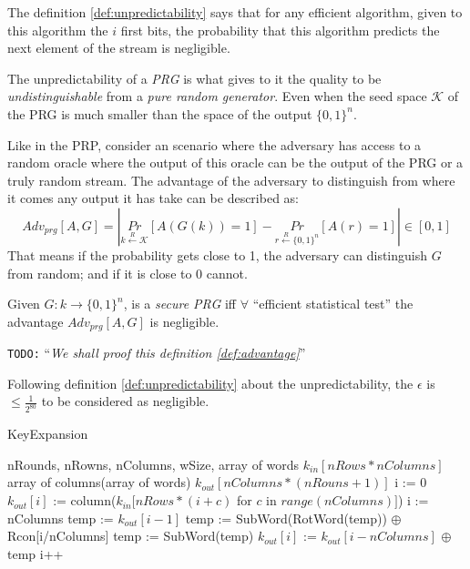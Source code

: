 \documentclass[10pt,a4paper,twoside]{llncs}
\newcommand{\todo}[1]{\texttt{\color{red}TODO:} ``\emph{#1}''}
\begin{document}
The definition \ref{def:unpredictability} says that for any efficient algorithm, given to this algorithm the $i$ first bits, the probability that this algorithm predicts the next element of the stream is negligible.

The unpredictability of a \emph{PRG} is what gives to it the quality to be \emph{undistinguishable} from a \emph{pure random generator}. Even when the seed space $\mathcal{K}$ of the PRG is much smaller than the space of the output $\{0,1\}^n$.

Like in the PRP, consider an scenario where the adversary has access to a random oracle where the output of this oracle can be the output of the PRG or a truly random stream. The advantage of the adversary to distinguish from where it comes any output it has take can be described as:
\begin{equation}\label{eq:prgAdv}
 {Adv}_{prg}[A,G] = \left|
                     \underset{k\overset{R}{\leftarrow}\mathcal{K}}{Pr}\left[A(G(k))=1\right]-
                     \underset{r\overset{R}{\leftarrow}\{0,1\}^n}{Pr}\left[A(r)=1\right]
                    \right|\in [0,1]
\end{equation}
That means if the probability gets close to 1, the adversary can distinguish $G$ from random; and if it is close to 0 cannot.

\begin{definition}\label{def:advantage}
 Given $G: k \rightarrow \{0,1\}^n$, is a \emph{secure PRG} iff $\forall$ ``efficient statistical test'' the advantage ${Adv}_{prg}[A,G]$ is negligible.
\end{definition}

\todo{We shall proof this definition \ref{def:advantage}}

Following definition \ref{def:unpredictability} about the unpredictability, the $\epsilon$ is $\leqslant\frac{1}{2^{80}}$ to be considered as negligible.

\begin{algorithm}
 \caption{KeyExpansion}
 \label{alg:keyExpansion}
 \begin{algorithmic}[1]
  \REQUIRE nRounds, nRowns, nColumns, wSize, array of words $k_{in}[nRows*nColumns]$
  \ENSURE array of columns(array of words) $k_{out}[nColumns*(nRouns+1)]$
  \STATE i := 0
    \STATE $k_{out}[i]$ := column($k_{in}[nRows*(i+c)$ for $c$ in $range(nColumns)]$)
  \ENDWHILE
  \STATE i := nColumns
    \STATE temp := $k_{out}[i-1]$
      \STATE temp := SubWord(RotWord(temp)) $\oplus$ Rcon[i/nColumns]
    \ELSE
      \STATE temp := SubWord(temp)
    \ENDIF
    \STATE $k_{out}[i]$ := $k_{out}[i-nColumns]$ $\oplus$ temp
    \STATE i++
  \ENDWHILE
 \end{algorithmic}
\end{algorithm}
\end{document}
